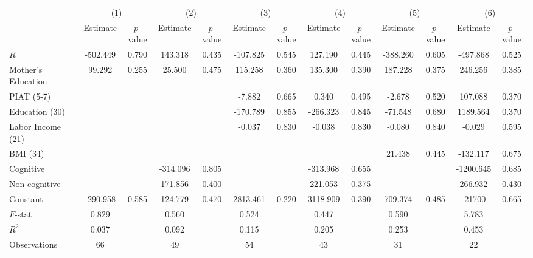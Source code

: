 \begin{tabular}{lcccccccccccc} \toprule
 & \multicolumn{2}{c}{(1)}  &  \multicolumn{2}{c}{(2)}  &  \multicolumn{2}{c}{(3)}  &  \multicolumn{2}{c}{(4)}  & \multicolumn{2}{c}{(5)} & \multicolumn{2}{c}{(6)} \\  
 & Estimate & $p$-value & Estimate & $p$-value & Estimate & $p$-value & Estimate & $p$-value & Estimate & $p$-value & Estimate & $p$-value \\ \midrule
$R$ &  -502.449 &     0.790 &   143.318 &     0.435 &  -107.825 &     0.545 &   127.190 &     0.445 &  -388.260 &     0.605 &  -497.868 &     0.525 \\  
Mother's Education &    99.292 &     0.255 &    25.500 &     0.475 &   115.258 &     0.360 &   135.300 &     0.390 &   187.228 &     0.375 &   246.256 &     0.385 \\  
PIAT (5-7) &         &         &         &         &    -7.882 &     0.665 &     0.340 &     0.495 &    -2.678 &     0.520 &   107.088 &     0.370 \\  
Education (30) &         &         &         &         &  -170.789 &     0.855 &  -266.323 &     0.845 &   -71.548 &     0.680 &  1189.564 &     0.370 \\  
Labor Income (21) &         &         &         &         &    -0.037 &     0.830 &    -0.038 &     0.830 &    -0.080 &     0.840 &    -0.029 &     0.595 \\  
BMI (34) &         &         &         &         &         &         &         &         &    21.438 &     0.445 &  -132.117 &     0.675 \\  
Cognitive &         &         &  -314.096 &     0.805 &         &         &  -313.968 &     0.655 &         &         & -1200.645 &     0.685 \\  
Non-cognitive &         &         &   171.856 &     0.400 &         &         &   221.053 &     0.375 &         &         &   266.932 &     0.430 \\  
Constant &  -290.958 &     0.585 &   124.779 &     0.470 &  2813.461 &     0.220 &  3118.909 &     0.390 &   709.374 &     0.485 & -21700 &     0.665 \\  \midrule
$F$-stat &     0.829 &         &     0.560 &         &     0.524 &         &     0.447 &         &     0.590 &         &     5.783 &         \\  
$R^2$ &     0.037 &         &     0.092 &         &     0.115 &         &     0.205 &         &     0.253 &         &     0.453 &         \\  
Observations &    66 &         &    49 &         &    54 &         &    43 &         &    31 &         &    22 &         \\  
\bottomrule \end{tabular}

